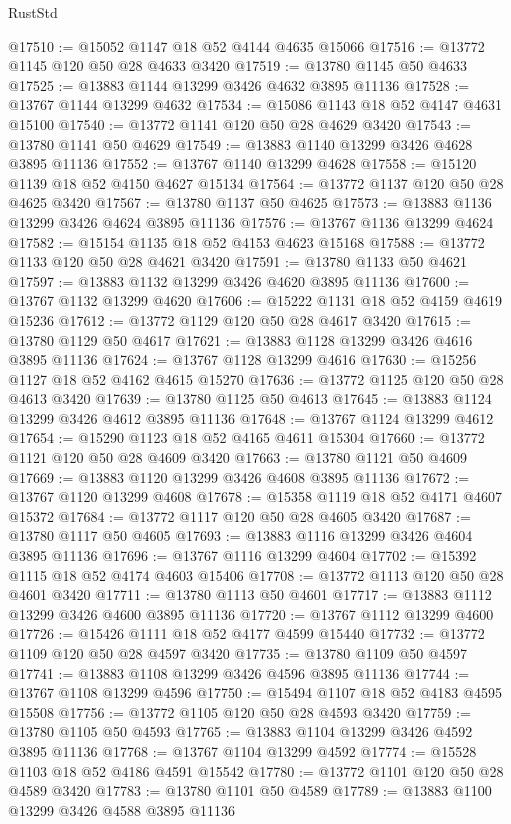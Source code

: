 \begin{lexlean}{RustStd}
\begin{coremodule}
@17510 := @15052 @1147 @18 @52 @4144 @4635 @15066
@17516 := @13772 @1145 @120 @50 @28 @4633 @3420
@17519 := @13780 @1145 @50 @4633
@17525 := @13883 @1144 @13299 @3426 @4632 @3895 @11136
@17528 := @13767 @1144 @13299 @4632
@17534 := @15086 @1143 @18 @52 @4147 @4631 @15100
@17540 := @13772 @1141 @120 @50 @28 @4629 @3420
@17543 := @13780 @1141 @50 @4629
@17549 := @13883 @1140 @13299 @3426 @4628 @3895 @11136
@17552 := @13767 @1140 @13299 @4628
@17558 := @15120 @1139 @18 @52 @4150 @4627 @15134
@17564 := @13772 @1137 @120 @50 @28 @4625 @3420
@17567 := @13780 @1137 @50 @4625
@17573 := @13883 @1136 @13299 @3426 @4624 @3895 @11136
@17576 := @13767 @1136 @13299 @4624
@17582 := @15154 @1135 @18 @52 @4153 @4623 @15168
@17588 := @13772 @1133 @120 @50 @28 @4621 @3420
@17591 := @13780 @1133 @50 @4621
@17597 := @13883 @1132 @13299 @3426 @4620 @3895 @11136
@17600 := @13767 @1132 @13299 @4620
@17606 := @15222 @1131 @18 @52 @4159 @4619 @15236
@17612 := @13772 @1129 @120 @50 @28 @4617 @3420
@17615 := @13780 @1129 @50 @4617
@17621 := @13883 @1128 @13299 @3426 @4616 @3895 @11136
@17624 := @13767 @1128 @13299 @4616
@17630 := @15256 @1127 @18 @52 @4162 @4615 @15270
@17636 := @13772 @1125 @120 @50 @28 @4613 @3420
@17639 := @13780 @1125 @50 @4613
@17645 := @13883 @1124 @13299 @3426 @4612 @3895 @11136
@17648 := @13767 @1124 @13299 @4612
@17654 := @15290 @1123 @18 @52 @4165 @4611 @15304
@17660 := @13772 @1121 @120 @50 @28 @4609 @3420
@17663 := @13780 @1121 @50 @4609
@17669 := @13883 @1120 @13299 @3426 @4608 @3895 @11136
@17672 := @13767 @1120 @13299 @4608
@17678 := @15358 @1119 @18 @52 @4171 @4607 @15372
@17684 := @13772 @1117 @120 @50 @28 @4605 @3420
@17687 := @13780 @1117 @50 @4605
@17693 := @13883 @1116 @13299 @3426 @4604 @3895 @11136
@17696 := @13767 @1116 @13299 @4604
@17702 := @15392 @1115 @18 @52 @4174 @4603 @15406
@17708 := @13772 @1113 @120 @50 @28 @4601 @3420
@17711 := @13780 @1113 @50 @4601
@17717 := @13883 @1112 @13299 @3426 @4600 @3895 @11136
@17720 := @13767 @1112 @13299 @4600
@17726 := @15426 @1111 @18 @52 @4177 @4599 @15440
@17732 := @13772 @1109 @120 @50 @28 @4597 @3420
@17735 := @13780 @1109 @50 @4597
@17741 := @13883 @1108 @13299 @3426 @4596 @3895 @11136
@17744 := @13767 @1108 @13299 @4596
@17750 := @15494 @1107 @18 @52 @4183 @4595 @15508
@17756 := @13772 @1105 @120 @50 @28 @4593 @3420
@17759 := @13780 @1105 @50 @4593
@17765 := @13883 @1104 @13299 @3426 @4592 @3895 @11136
@17768 := @13767 @1104 @13299 @4592
@17774 := @15528 @1103 @18 @52 @4186 @4591 @15542
@17780 := @13772 @1101 @120 @50 @28 @4589 @3420
@17783 := @13780 @1101 @50 @4589
@17789 := @13883 @1100 @13299 @3426 @4588 @3895 @11136

\end{coremodule}
\end{lexlean}
